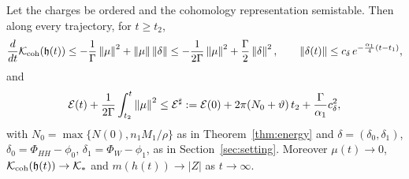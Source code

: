 \begin{theorem}\label{thm:relaxation}
Let the charges be ordered and the cohomology representation semistable.
Then along every trajectory, for $t\geq t_2$,
\begin{equation}\label{eq:KNderivative}
 \frac{d}{dt}\mathcal K_{\mathrm{coh}}(\mathfrak h(t))
 \leq-\frac1\Gamma\left\lVert\mu\right\rVert^2+\left\lVert\mu\right\rVert\left\lVert\delta\right\rVert
 \leq-\frac1{2\Gamma}\left\lVert\mu\right\rVert^2+\frac\Gamma2\left\lVert\delta\right\rVert^2,
 \qquad\left\lVert\delta(t)\right\rVert\leq c_\delta\,e^{-\frac{\alpha_1}4(t-t_1)},
\end{equation}
and
\[
 \mathcal E(t)+\frac1{2\Gamma}\int_{t_2}^t\left\lVert\mu\right\rVert^2
 \leq\mathcal E^\sharp:=\mathcal E(0)+2\pi(N_0+\vartheta)\,t_2+\frac\Gamma{\alpha_1}c_\delta^2 ,
\]
with $N_0=\max\{N(0),n_1M_1/\rho\}$ as in Theorem~\ref{thm:energy} and
$\delta=(\delta_0,\delta_1)$, $\delta_0=\Phi_{HH}-\phi_0$,
$\delta_1=\Phi_W-\phi_1$, as in Section~\ref{sec:setting}. Moreover
$\mu(t)\to0$, $\mathcal K_{\mathrm{coh}}(\mathfrak h(t))\to\mathcal K_*$ and $m(h(t))\to|Z|$ as $t\to\infty$.
\end{theorem}

